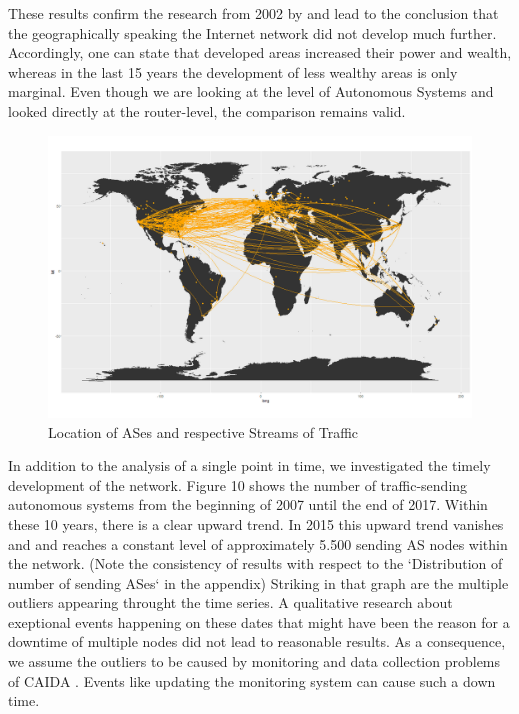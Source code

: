 \documentclass[conference, 11pt]{IEEEtran}
\begin{document}
These results confirm the research from 2002 by \cite{geoResearch} and lead to the conclusion that the geographically speaking the Internet network did not develop much further. Accordingly, one can state that developed areas increased their power and wealth, whereas in the last 15 years the development of less wealthy areas is only marginal. Even though we are looking at the level of Autonomous Systems and \cite{geoResearch} looked directly at the router-level, the comparison remains valid. \\


\vspace{0.5cm}
\begin{figure}[htbp]
\centerline{\includegraphics[width=\columnwidth]{Graphics/connectedASes.png}}
\caption{Location of ASes and respective Streams of Traffic}
\label{fig}
\end{figure}
\vspace{0.5cm}

In addition to the analysis of a single point in time, we investigated the timely development of the network. Figure 10 shows the number of traffic-sending autonomous systems from the beginning of 2007 until the end of 2017. Within these 10 years, there is a clear upward trend. In 2015 this upward trend vanishes and and reaches a constant level of approximately 5.500 sending AS nodes within the network. (Note the consistency of results with respect to  the `Distribution of number of sending ASes` in the appendix) Striking in that graph are the multiple outliers appearing throught the time series. A qualitative research about exeptional events happening on these dates that might have been the reason for a downtime of multiple nodes did not lead to reasonable results. As a consequence, we assume the outliers to be caused by monitoring and data collection problems of CAIDA \cite{CaidaDataCollection}. Events like updating the monitoring system can cause such a down time. 
\end{document}
